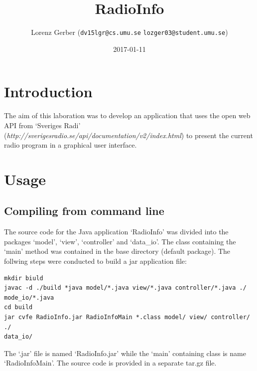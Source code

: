 \documentclass[a4paper,11pt,twoside]{article}
\title{RadioInfo}
\author{Lorenz Gerber ({\tt{dv15lgr@cs.umu.se}} {\tt{lozger03@student.umu.se}})}
\date{2017-01-11}
\begin{document}
\lstset{language=C}
\maketitle
\thispagestyle{empty}
\newpage
\tableofcontents
\thispagestyle{empty}
\newpage

\clearpage
{}

\section{Introduction}
The aim of this laboration was to develop an application that uses the open web API from `Sveriges Radi' (\textit{http://sverigesradio.se/api/documentation/v2/index.html}) to present the current radio program in a graphical user interface. 

\section{Usage} 

\subsection{Compiling from command line}
The source code for the Java application `RadioInfo' was divided into the packages `model', `view', `controller' and `data\_io'. The class containing the `main' method was contained in the base directory (default package). The follwing steps were conducted to build a jar application file:

\begin{verbatim}
mkdir biuld
javac -d ./build *java model/*.java view/*.java controller/*.java ./
mode_io/*.java
cd build
jar cvfe RadioInfo.jar RadioInfoMain *.class model/ view/ controller/ ./
data_io/
\end{verbatim}

The `.jar' file is named `RadioInfo.jar' while the `main' containing class is name `RadioInfoMain'. The source code is provided in a separate tar.gz file. 
\end{document}
